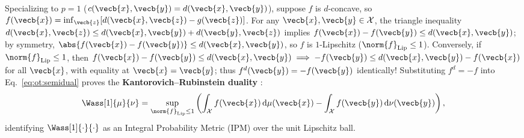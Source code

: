 \documentclass[../../../../master.tex]{subfiles}
\begin{document}
\begin{coremath}
Specializing to $p = 1$ ($c(\vecb{x}, \vecb{y}) = d(\vecb{x}, \vecb{y})$), suppose $f$ is $d$-concave, so $f(\vecb{x}) = \inf_{\vecb{z}} [d(\vecb{x}, \vecb{z}) - g(\vecb{z})]$. For any $\vecb{x}, \vecb{y} \in \mathcal{X}$, the triangle inequality $d(\vecb{x}, \vecb{z}) \le d(\vecb{x}, \vecb{y}) + d(\vecb{y}, \vecb{z})$ implies $f(\vecb{x}) - f(\vecb{y}) \le d(\vecb{x}, \vecb{y})$; by symmetry, $\abs{f(\vecb{x}) - f(\vecb{y})} \le d(\vecb{x}, \vecb{y})$, so $f$ is $1$-Lipschitz ($\norm{f}_{\mathrm{Lip}} \le 1$). Conversely, if $\norm{f}_{\mathrm{Lip}} \le 1$, then $f(\vecb{x}) - f(\vecb{y}) \le d(\vecb{x}, \vecb{y}) \implies -f(\vecb{y}) \le d(\vecb{x}, \vecb{y}) - f(\vecb{x})$ for all $\vecb{x}$, with equality at $\vecb{x} = \vecb{y}$; thus $f^d(\vecb{y}) = -f(\vecb{y})$ identically! Substituting $f^d = -f$ into Eq.~\eqref{eq:ot:semidual} proves the \textbf{Kantorovich--Rubinstein duality}  :
\begin{equation}
\label{eq:ot:kr_duality}
  \Wass[1]{\mu}{\nu} = \sup_{\norm{f}_{\mathrm{Lip}} \le 1} \left( \int_{\mathcal{X}} f(\vecb{x})\,\mathrm{d}\mu(\vecb{x}) - \int_{\mathcal{X}} f(\vecb{y})\,\mathrm{d}\nu(\vecb{y}) \right),
\end{equation}
identifying $\Wass[1]{\cdot}{\cdot}$ as an Integral Probability Metric (IPM) over the unit Lipschitz ball.
\end{coremath}
\end{document}
